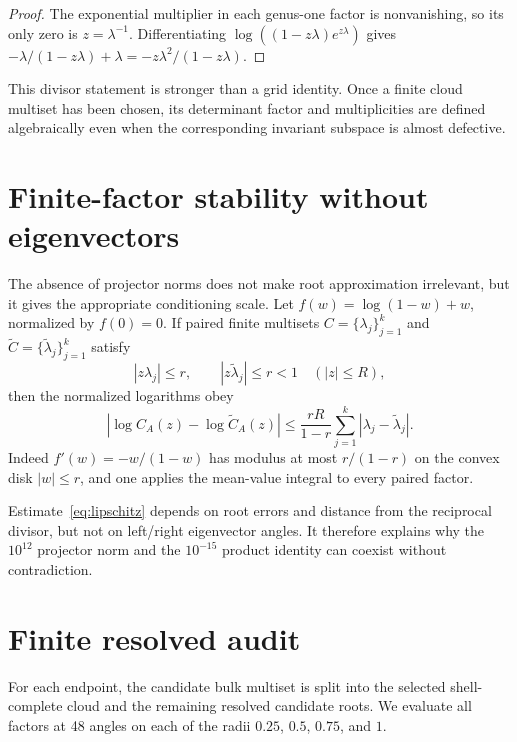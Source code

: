 \documentclass[11pt]{article}
\theoremstyle{remark}
\begin{document}
\begin{proof}
The exponential multiplier in each genus-one factor is nonvanishing, so its
only zero is $z=\lambda^{-1}$.  Differentiating
$\log((1-z\lambda)e^{z\lambda})$ gives
$-\lambda/(1-z\lambda)+\lambda=-z\lambda^2/(1-z\lambda)$.
\end{proof}

This divisor statement is stronger than a grid identity.  Once a finite
cloud multiset has been chosen, its determinant factor and multiplicities are
defined algebraically even when the corresponding invariant subspace is
almost defective.

\section{Finite-factor stability without eigenvectors}

The absence of projector norms does not make root approximation irrelevant,
but it gives the appropriate conditioning scale.  Let
$f(w)=\log(1-w)+w$, normalized by $f(0)=0$.  If paired finite multisets
$C=\{\lambda_j\}_{j=1}^k$ and
$\widetilde C=\{\widetilde\lambda_j\}_{j=1}^k$ satisfy
\[
 |z\lambda_j|\le r,
 \qquad |z\widetilde\lambda_j|\le r<1
 \quad (|z|\le R),
\]
then the normalized logarithms obey
\begin{equation}\label{eq:lipschitz}
 \left|\log C_A(z)-\log \widetilde C_A(z)\right|
 \le \frac{rR}{1-r}
       \sum_{j=1}^k|\lambda_j-\widetilde\lambda_j|.
\end{equation}
Indeed $f'(w)=-w/(1-w)$ has modulus at most $r/(1-r)$ on the convex disk
$|w|\le r$, and one applies the mean-value integral to every paired factor.

Estimate~\eqref{eq:lipschitz} depends on root errors and distance from the
reciprocal divisor, but not on left/right eigenvector angles.  It therefore
explains why the $10^{12}$ projector norm and the $10^{-15}$ product identity
can coexist without contradiction.

\section{Finite resolved audit}

For each endpoint, the candidate bulk multiset is split into the selected
shell-complete cloud and the remaining resolved candidate roots.  We evaluate
all factors at 48 angles on each of the radii $0.25$, $0.5$, $0.75$, and $1$.
\end{document}
